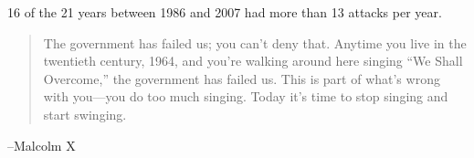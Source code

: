 \documentclass{exam}
\begin{document}
\begin{description}
\begin{parts}
            16 of the 21 years between 1986 and 2007 had more than 13 attacks per year.

        \end{parts}


    \end{description}

  \else
    \vspace{10 cm}
    \begin{quote}
      \begin{em}
        The government has failed us; you can't deny that. Anytime you live in
        the twentieth century, 1964, and you're walking around here singing
        ``We Shall Overcome,'' the government has failed us. This is part of
        what's wrong with you---you do too much singing.  Today it's time to
        stop singing and start swinging. 
        
      \end{em}
    \end{quote}
    \hspace{1 cm} --Malcolm X
  \fi
\end{document}
